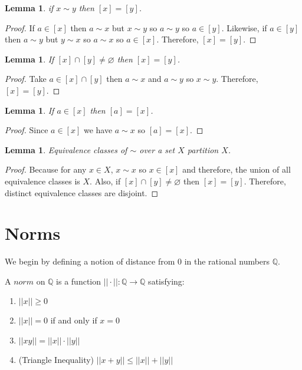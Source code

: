 \documentclass{article}
\newcommand{\Q}{\mathbb{Q}}
\renewcommand{\empty}{\varnothing}
\newenvironment{definition}[1][Definition:]{\begin{trivlist}
\item[\hskip \labelsep {\bfseries #1}]}{\end{trivlist}}
\theoremstyle{theorem}
\newtheorem{lemma}[theorem]{Lemma}
\theoremstyle{definition}
\theoremstyle{definition}
\theoremstyle{remark}
\theoremstyle{definition}
\theoremstyle{remark}
\begin{document}
\begin{lemma}
if $x \sim y$ then $[x] = [y]$.
\end{lemma}

\begin{proof}
If $a \in [x]$ then $a \sim x$ but $x \sim y$ so $a \sim y$ so $a \in [y]$. Likewise, if $a \in [y]$ then $a \sim y$ but $y \sim x$ so $a \sim x$ so $a \in [x]$. Therefore, $[x] = [y]$.
\end{proof}

\begin{lemma}
If $[x] \cap [y] \neq \empty$ then $[x] = [y]$.
\end{lemma}

\begin{proof}
Take $a \in [x] \cap [y]$ then $a \sim x$ and $a \sim y$ so $x \sim y$. Therefore, $[x] = [y]$.
\end{proof}

\begin{lemma}
If $a \in [x]$ then $[a] = [x]$.
\end{lemma}

\begin{proof}
Since $a \in [x]$ we have $a \sim x$ so $[a] = [x]$. 
\end{proof}

\begin{lemma}
Equivalence classes of $\sim$ over a set $X$ partition $X$. 
\end{lemma}

\begin{proof}
Because for any $x \in X$, $x \sim x$ so $x \in [x]$ and therefore, the union of all equivalence classes is $X$. Also, if $[x] \cap [y] \neq \empty$ then $[x] = [y]$. Therefore, distinct equivalence classes are disjoint. 
\end{proof}

\section{Norms} 
We begin by defining a notion of distance from 0 in the rational numbers $\Q$.
\begin{definition}
A $\textit{norm}$ on $\mathbb{Q}$ is a function $||\cdot ||: \Q \to \Q$ satisfying:
\begin{enumerate}
\item $||x|| \ge 0$
\item $||x|| = 0$ if and only if $x = 0$
\item $||xy|| = ||x||\cdot||y||$
\item (Triangle Inequality) $||x+y|| \le ||x|| + ||y||$
\end{enumerate}
\end{definition}
\end{document}
